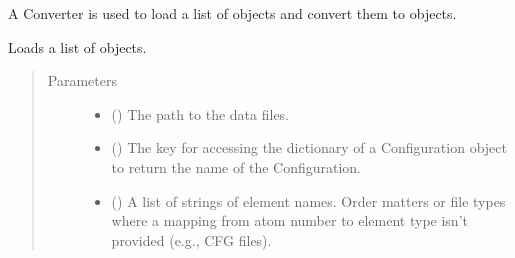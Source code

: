 \documentclass[letterpaper,10pt,english]{sphinxmanual}
\begin{document}
\begin{fulllineitems}
\label{\detokenize{converters:colabfit.tools.converters.BaseConverter}}
\sphinxAtStartPar
A Converter is used to load a list of  objects and convert
them to {\hyperref[\detokenize{configuration:colabfit.tools.configuration.Configuration}]{}} objects.

\begin{fulllineitems}
\label{\detokenize{converters:colabfit.tools.converters.BaseConverter.load}}
\sphinxAtStartPar
Loads a list of 
objects.
\begin{quote}\begin{description}
\item[{Parameters}] \leavevmode\begin{itemize}
\item {} 
\sphinxAtStartPar
{} () \textendash{} The path to the data files.

\item {} 
\sphinxAtStartPar
{} () \textendash{} The key for accessing the  dictionary of a
Configuration object to return the name of the Configuration.

\item {} 
\sphinxAtStartPar
{} () \textendash{} A list of strings of element names. Order matters or file types
where a mapping from atom number to element type isn’t provided
(e.g., CFG files).


\end{itemize}
\end{description}
\end{quote}
\end{fulllineitems}
\end{fulllineitems}
\end{document}
